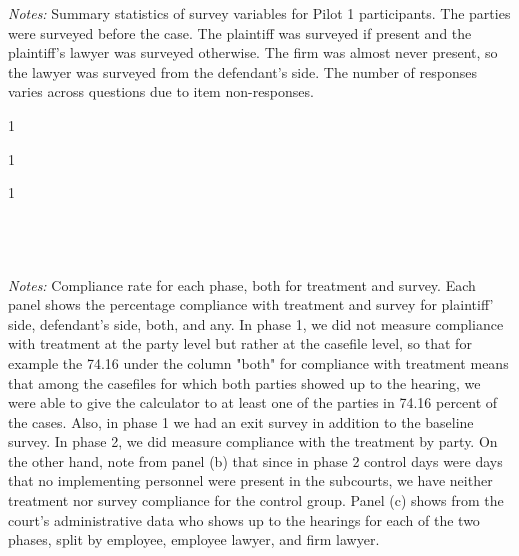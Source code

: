 \begin{table}[!ht]
     \caption{Survey variables summary statistics}
     \label{ss_survey}
     \begin{center}
     \resizebox{16.5cm}{!}{
     \scriptsize{}
     }
     \end{center}
     \scriptsize
     \textit{Notes:} Summary statistics of survey variables for Pilot 1 participants. The parties were surveyed before the case. The plaintiff was surveyed if present and the plaintiff's lawyer was surveyed otherwise. The firm was almost never present, so the lawyer was surveyed from the defendant's side. The number of responses varies across questions due to item non-responses. 
 \end{table}

\begin{landscape}
\begin{table}[!ht]
    \caption{Compliance Rate}
    \label{Table_compliance}
    \begin{subtable}{1\textwidth}
      \centering
        \caption{Phase 1}
        \scriptsize{}
    \end{subtable}%
    
    \bigskip
    \begin{subtable}{1\textwidth}
      \centering
        \caption{Phase 2}
        \scriptsize{}
    \end{subtable}
    
      \bigskip
    \begin{subtable}{1\textwidth}
      \centering
        \caption{\% Shows up}
        \scriptsize{}
    \end{subtable}
            \scriptsize
           \\
           \\
           \\
  \textit{Notes:} 
  Compliance rate for each phase, both for treatment and survey. Each panel shows the percentage compliance with treatment and survey for plaintiff' side, defendant's side, both, and any. In phase 1, we did not measure compliance with treatment at the party level but rather at the casefile level, so that for example the 74.16 under the column "both" for compliance with treatment means that among the casefiles for which both parties showed up to the hearing, we were able to give the calculator to at least one of the parties in 74.16 percent of the cases. Also, in phase 1 we had an exit survey in addition to the baseline survey. In phase 2, we did measure compliance with the treatment by party. On the other hand, note from panel (b) that since in phase 2 control days were days that no implementing personnel were present in the subcourts, we have neither treatment nor survey compliance for the control group. Panel (c) shows from the court's administrative data who shows up to the hearings for each of the two phases, split by employee, employee lawyer, and firm lawyer.
\end{table}
\end{landscape}
